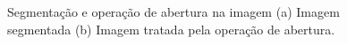 \begin{figure}[H]
\centering
    \caption{\label{fig:otsu_open} Segmentação e operação de abertura na imagem (a) Imagem segmentada (b) Imagem tratada pela operação de abertura.}

\end{figure}
